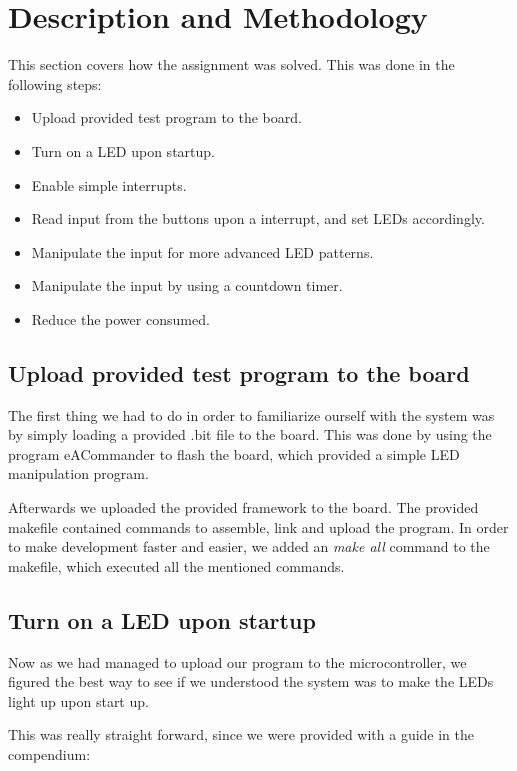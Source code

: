 \section{Description and Methodology}\label{chapter:Description and Methodology}
This section covers how the assignment was solved. This was done in the following steps:

\begin{itemize}
	\item Upload provided test program to the board.
	\item Turn on a LED upon startup. 
	\item Enable simple interrupts.
	\item Read input from the buttons upon a interrupt, and set LEDs accordingly. 
	\item Manipulate the input for more advanced LED patterns.
	\item Manipulate the input by using a countdown timer.
	\item Reduce the power consumed. 
\end{itemize}


\subsection{Upload provided test program to the board}

The first thing we had to do in order to familiarize ourself with the system was by simply 
loading a provided .bit file to the board. This was done by using the program eACommander to
flash the board, which provided a simple LED manipulation program. 

Afterwards we uploaded the provided framework to the board. The provided makefile contained 
commands to assemble, link and upload the program. In order to make development faster and easier, we added an \textit{make all} command to the makefile, which executed all the mentioned commands. 

\subsection{Turn on a LED upon startup}

Now as we had managed to upload our program to the microcontroller, we figured the best way to see
if we understood the system was to make the LEDs light up upon start up. 

This was really straight forward, since we were provided with a guide in the compendium:

